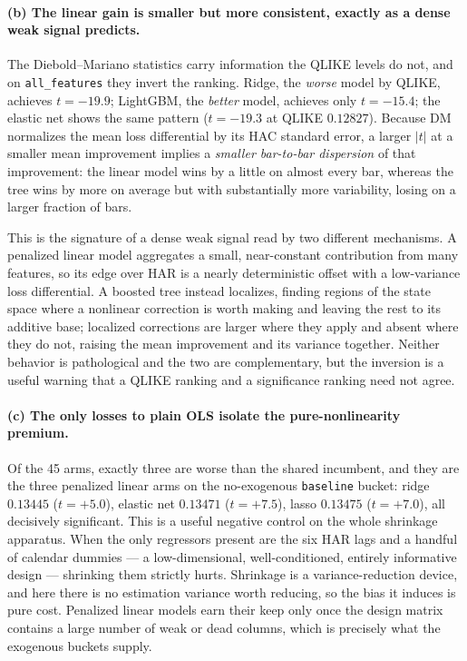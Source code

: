 \paragraph{(b) The linear gain is smaller but more consistent, exactly as a dense
weak signal predicts.}
The Diebold--Mariano statistics carry information the QLIKE levels do not, and on
\texttt{all\_features} they invert the ranking. Ridge, the \emph{worse} model by
QLIKE, achieves $t = -19.9$; LightGBM, the \emph{better} model, achieves only
$t = -15.4$; the elastic net shows the same pattern ($t = -19.3$ at QLIKE
$0.12827$). Because DM normalizes the mean loss differential by its HAC standard
error, a larger $|t|$ at a smaller mean improvement implies a \emph{smaller
bar-to-bar dispersion} of that improvement: the linear model wins by a little on
almost every bar, whereas the tree wins by more on average but with substantially
more variability, losing on a larger fraction of bars.

This is the signature of a dense weak signal read by two different mechanisms. A
penalized linear model aggregates a small, near-constant contribution from many
features, so its edge over HAR is a nearly deterministic offset with a
low-variance loss differential. A boosted tree instead localizes, finding regions
of the state space where a nonlinear correction is worth making and leaving the
rest to its additive base; localized corrections are larger where they apply and
absent where they do not, raising the mean improvement and its variance together.
Neither behavior is pathological and the two are complementary, but the inversion
is a useful warning that a QLIKE ranking and a significance ranking need not
agree.

\paragraph{(c) The only losses to plain OLS isolate the pure-nonlinearity
premium.}
Of the 45 arms, exactly three are worse than the shared incumbent, and they are
the three penalized linear arms on the no-exogenous \texttt{baseline} bucket:
ridge $0.13445$ ($t = +5.0$), elastic net $0.13471$ ($t = +7.5$), lasso
$0.13475$ ($t = +7.0$), all decisively significant. This is a useful negative
control on the whole shrinkage apparatus. When the only regressors present are
the six HAR lags and a handful of calendar dummies --- a low-dimensional,
well-conditioned, entirely informative design --- shrinking them strictly hurts.
Shrinkage is a variance-reduction device, and here there is no estimation
variance worth reducing, so the bias it induces is pure cost. Penalized linear
models earn their keep only once the design matrix contains a large number of
weak or dead columns, which is precisely what the exogenous buckets supply.

